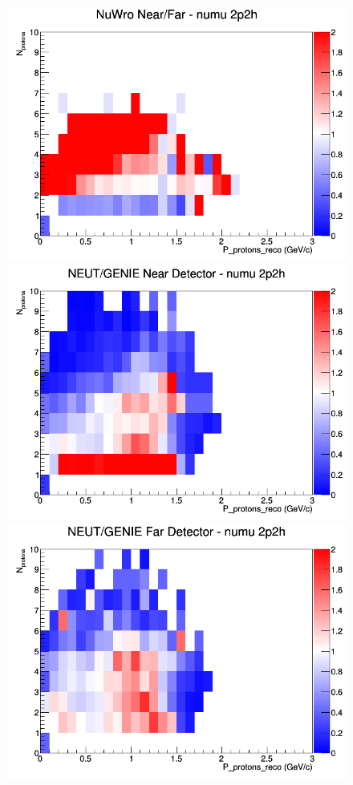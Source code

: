 \begin{figure}[h]
\endminipage
{}
\includegraphics[width=\linewidth]{eff_N_P/GAr/protons/ratios/2p2h_NuWro_numu_NF_N_P.png}
\endminipage
\newline
{}
\includegraphics[width=\linewidth]{eff_N_P/GAr/protons/ratios/2p2h_NEUT_GENIE_numu_near_N_P.png}
\endminipage
{}
\includegraphics[width=\linewidth]{eff_N_P/GAr/protons/ratios/2p2h_NEUT_GENIE_numu_far_N_P.png}

\end{figure}
